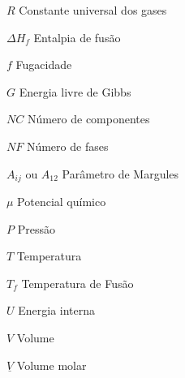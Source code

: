 
\begin{simbolos}
    \item[$R$] Constante universal dos gases
    \item[$\Delta H_{f}$] Entalpia de fusão
    \item[$f$] Fugacidade
    \item[$G$] Energia livre de Gibbs
    \item[$NC$] Número de componentes
    \item[$NF$] Número de fases
    \item[$A_{ij}$ ou $A_{12}$] Parâmetro de Margules
    \item[$\mu$] Potencial químico
    \item[$P$] Pressão
    \item[$T$] Temperatura
    \item[$T_{f}$] Temperatura de Fusão
    \item[$U$] Energia interna
    \item[$V$] Volume
    \item[$\underline{V}$] Volume molar
\end{simbolos}

